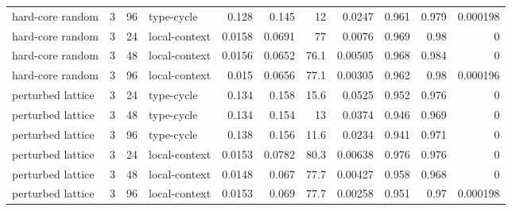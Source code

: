 \begin{table}[H]
{\begin{tabular}{lrrlrrrrrrr}
hard-core random & 3 & 96 & type-cycle & 0.128 & 0.145 & 12 & 0.0247 & 0.961 & 0.979 & 0.000198 \\
hard-core random & 3 & 24 & local-context & 0.0158 & 0.0691 & 77 & 0.0076 & 0.969 & 0.98 & 0 \\
hard-core random & 3 & 48 & local-context & 0.0156 & 0.0652 & 76.1 & 0.00505 & 0.968 & 0.984 & 0 \\
hard-core random & 3 & 96 & local-context & 0.015 & 0.0656 & 77.1 & 0.00305 & 0.962 & 0.98 & 0.000196 \\
perturbed lattice & 3 & 24 & type-cycle & 0.134 & 0.158 & 15.6 & 0.0525 & 0.952 & 0.976 & 0 \\
perturbed lattice & 3 & 48 & type-cycle & 0.134 & 0.154 & 13 & 0.0374 & 0.946 & 0.969 & 0 \\
perturbed lattice & 3 & 96 & type-cycle & 0.138 & 0.156 & 11.6 & 0.0234 & 0.941 & 0.971 & 0 \\
perturbed lattice & 3 & 24 & local-context & 0.0153 & 0.0782 & 80.3 & 0.00638 & 0.976 & 0.976 & 0 \\
perturbed lattice & 3 & 48 & local-context & 0.0148 & 0.067 & 77.7 & 0.00427 & 0.958 & 0.968 & 0 \\
perturbed lattice & 3 & 96 & local-context & 0.0153 & 0.069 & 77.7 & 0.00258 & 0.951 & 0.97 & 0.000198 \\
\bottomrule
\end{tabular}
}
\end{table}
